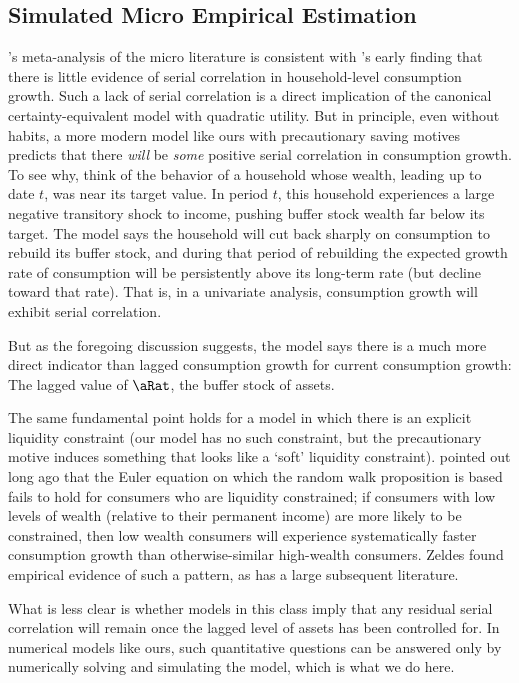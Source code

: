 \documentclass[titlepage]{\econtex}
\begin{document}
\subsection{Simulated Micro Empirical Estimation} \label{subsec:simMicro}

\cite{hrsHabit}'s meta-analysis of the micro literature is consistent with \cite{dynanHabits}'s early finding that there is little evidence of serial correlation in household-level consumption growth.  Such a lack of serial correlation is a direct implication of the canonical \cite{hallRandomWalk} certainty-equivalent model with quadratic utility.  But in principle, even without habits, a more modern model like ours with precautionary saving motives predicts that there {\it will} be {\it some} positive serial correlation in consumption growth.  To see why, think of the behavior of a household whose wealth, leading up to date $t$, was near its target value.
In period $t$, this household experiences a large negative transitory shock to income, pushing buffer stock wealth far below its target.  The model says the household will cut back sharply on consumption to rebuild its buffer stock, and during that period of rebuilding the expected growth rate of consumption will be persistently above its long-term rate (but decline toward that rate).  That is, in a univariate analysis, consumption growth will exhibit serial correlation.

But as the foregoing discussion suggests, the model says there is a much more direct indicator than lagged consumption growth for current consumption growth:  The lagged value of $\aRat$, the buffer stock of assets.

The same fundamental point holds for a model in which there is an explicit liquidity constraint (our model has no such constraint, but the precautionary motive induces something that looks like a `soft' liquidity constraint).  \cite{zeldes:jpe} pointed out long ago that the Euler equation on which the random walk proposition is based fails to hold for consumers who are liquidity constrained; if consumers with low levels of wealth (relative to their permanent income) are more likely to be constrained, then low wealth consumers will experience systematically faster consumption growth than otherwise-similar high-wealth consumers.  Zeldes found empirical evidence of such a pattern, as has a large subsequent literature.

What is less clear is whether models in this class imply that any residual serial correlation will remain once the lagged level of assets has been controlled for.  In numerical models like ours, such quantitative questions can be answered only by numerically solving and simulating the model, which is what we do here.
\end{document}
